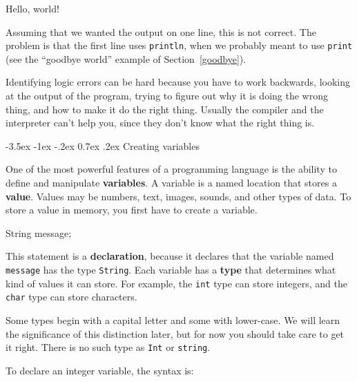 \documentclass[12pt]{book}
\makeatletter
\theoremstyle{exercise}
\newcommand{\java}[1]{\verb"#1"}
\renewcommand{\section}{\@startsection{section}{1}{\z@}%
    {-3.5ex \@plus -1ex \@minus -.2ex}%
    {0.7ex \@plus.2ex}%
    {\normalfont\Large\bfseries}}
\newcommand{\java}[1]{\lstinline{#1}} %
\makeatother
\begin{document}
\begin{stdout}
Hello,
world!
\end{stdout}

Assuming that we wanted the output on one line, this is not correct.
The problem is that the first line uses \java{println}, when we probably meant to use \java{print} (see the ``goodbye world'' example of Section~\ref{goodbye}).

Identifying logic errors can be hard because you have to work backwards, looking at the output of the program, trying to figure out why it is doing the wrong thing, and how to make it do the right thing.
Usually the compiler and the interpreter can't help you, since they don't know what the right thing is.


\section{Creating variables}


One of the most powerful features of a programming language is the ability to define and manipulate {\bf variables}.
A variable is a named location that stores a {\bf value}.
Values may be numbers, text, images, sounds, and other types of data.
To store a value in memory, you first have to create a variable.

\begin{code}
    String message;
\end{code}


This statement is a {\bf declaration}, because it declares that the variable named \java{message} has the type \java{String}.
Each variable has a {\bf type} that determines what kind of values it can store.
For example, the \java{int} type can store integers, and the \java{char} type can store characters.

Some types begin with a capital letter and some with lower-case.
We will learn the significance of this distinction later, but for now you should take care to get it right.
There is no such type as \java{Int} or \java{string}.

To declare an integer variable, the syntax is:
\end{document}

